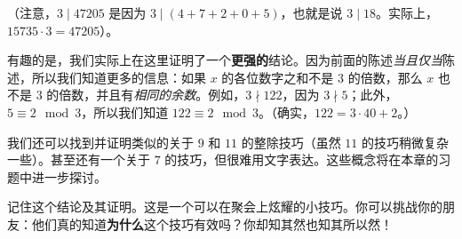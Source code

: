 \begin{example}
    （注意，$3 \mid 47205$ 是因为 $3 \mid (4 + 7 + 2 + 0 + 5)$，也就是说 $3 \mid 18$。实际上，$15735 \cdot 3 = 47205$）。

    有趣的是，我们实际上在这里证明了一个\textbf{更强的}结论。因为前面的陈述\emph{当且仅当}陈述，所以我们知道更多的信息：如果 $x$ 的各位数字之和不是 $3$ 的倍数，那么 $x$ 也不是 $3$ 的倍数，并且有\emph{相同的余数}。例如，$3 \nmid 122$，因为 $3 \nmid 5$；此外，$5 \equiv 2 \mod 3$，所以我们知道 $122 \equiv 2 \mod 3$。（确实，$122 = 3 \cdot 40 + 2$。）

    我们还可以找到并证明类似的关于 $9$ 和 $11$ 的整除技巧（虽然 $11$ 的技巧稍微复杂一些）。甚至还有一个关于 $7$ 的技巧，但很难用文字表达。这些概念将在本章的习题中进一步探讨。
    
    记住这个结论及其证明。这是一个可以在聚会上炫耀的小技巧。你可以挑战你的朋友：他们真的知道\textbf{为什么}这个技巧有效吗？你却知其然也知其所以然！
\end{example}
